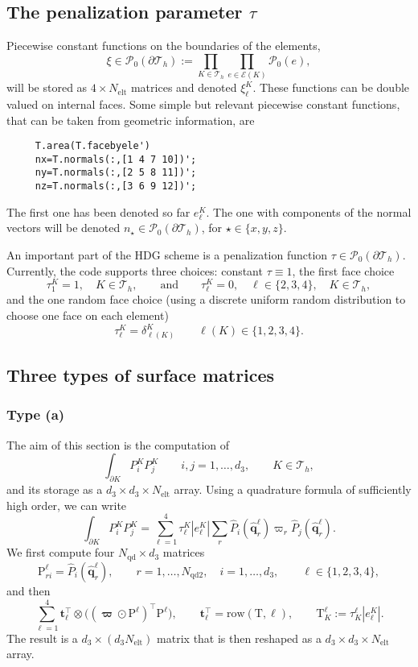 \documentclass[10pt,english]{article}
\newcommand{\Nelt}{{N_{\mathrm{elt}}}}
\newcommand{\Nnd}{{N_{\mathrm{qd}}}}
\newcommand{\Nndb}{{N_{\mathrm{qd2}}}}
\newcommand{\qq}{\widehat{\mathbf q}}
\begin{document}
\subsection{The penalization parameter $\tau$}

Piecewise constant functions on the boundaries of the elements,
\[
\xi\in \mathcal P_0(\partial\mathcal T_h):= \prod_{K\in \mathcal T_h}\prod_{e\in \mathcal E(K)} \mathcal P_0(e),
\]
will be stored as $4\times \Nelt$ matrices and denoted $\xi_\ell^K$. These functions can be double valued on internal faces. Some simple but relevant piecewise constant functions, that can be taken from geometric information, are
\begin{verbatim}
     T.area(T.facebyele')
     nx=T.normals(:,[1 4 7 10])';
     ny=T.normals(:,[2 5 8 11])';
     nz=T.normals(:,[3 6 9 12])';
\end{verbatim}
The first one has been denoted so far $e_\ell^K$. The one with components of the normal vectors will be denoted $n_\star\in \mathcal P_0(\partial\mathcal T_h)$, for $\star\in \{x,y,z\}$.

An important part of the HDG scheme is a penalization function $\tau\in \mathcal P_0(\partial\mathcal T_h)$. Currently, the code supports three choices: constant $\tau\equiv 1$, the first face choice
\[
\tau_1^K=1, \quad K\in \mathcal T_h,\qquad \mbox{and}\qquad \tau_\ell^K=0, \quad \ell\in \{2,3,4\}, \quad K\in \mathcal T_h,
\]
and the one random face choice (using a discrete uniform random distribution to choose one face on each element)
\[
\tau_\ell^K=\delta_{\ell(K)}^K \qquad \ell(K)\in \{1,2,3,4\}.
\]







\subsection{Three types of surface matrices}\label{sec:5.4}

\subsubsection*{Type (a)}

The aim of this section is the computation of
\[
\int_{\partial K} P_i^K P_j^K \qquad i,j=1,\ldots,d_3, \qquad K\in \mathcal T_h,
\]
and its storage as a $d_3\times d_3\times \Nelt$ array. Using a quadrature formula of sufficiently high order, we can write
\[
\int_{\partial K} P_i^K P_j^K=\sum_{\ell=1}^4 {\tau_\ell^K |e_\ell^K|} \sum_r \widehat P_i(\qq_r^\ell) \varpi_r \widehat P_j(\qq_r^\ell).
\]
We first compute four $\Nnd\times d_3$ matrices
\[
\mathrm P_{ri}^\ell =\widehat P_i(\qq_r^\ell), \qquad r=1,\ldots,\Nndb, \quad i=1,\ldots,d_3,\qquad \ell\in \{1,2,3,4\},
\]
and then
\[
\sum_{\ell=1}^4 \mathbf t_\ell^\top \otimes \Big( (\boldsymbol\varpi\odot\mathrm P^\ell)^\top \mathrm P^\ell\Big), \qquad \mathbf t_\ell^\top=\mathrm{row}(\mathrm T,\ell), \qquad \mathrm T_K^\ell:=\tau_K^\ell |e_\ell^K|.
\]
The result is a $d_3\times (d_3\Nelt)$ matrix that is then reshaped as a $d_3\times d_3\times \Nelt$ array.
\end{document}
